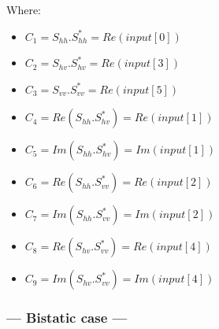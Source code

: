 \begin{enumerate}
Where:
\begin{itemize}
\item $ C_{1} = S_{hh}.S_{hh}^{*} = Re(input[0]) $ 
\item $ C_{2} = S_{hv}.S_{hv}^{*} = Re(input[3]) $ 
\item $ C_{3} = S_{vv}.S_{vv}^{*} = Re(input[5]) $ 
\item $ C_{4} = Re(S_{hh}.S_{hv}^{*}) = Re(input[1]) $ 
\item $ C_{5} = Im(S_{hh}.S_{hv}^{*}) = Im(input[1]) $ 
\item $ C_{6} = Re(S_{hh}.S_{vv}^{*}) = Re(input[2]) $ 
\item $ C_{7} = Im(S_{hh}.S_{vv}^{*}) = Im(input[2]) $ 
\item $ C_{8} = Re(S_{hv}.S_{vv}^{*}) = Re(input[4]) $ 
\item $ C_{9} = Im(S_{hv}.S_{vv}^{*}) = Im(input[4]) $ 
\end{itemize}
 
\end{enumerate}

\subsubsection{--- Bistatic case ---}

